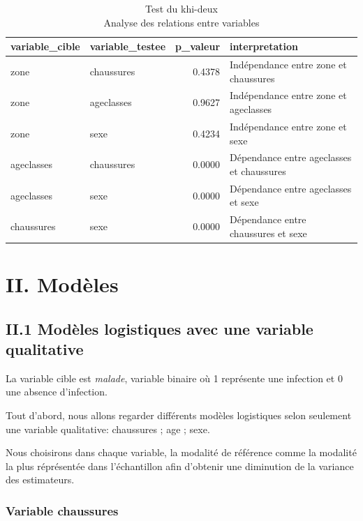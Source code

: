 \documentclass[
]{article}
\begin{document}
\begin{table}[!t]
\caption*{
{\large Test du khi-deux} \\ 
{\small Analyse des relations entre variables}
} 
\fontsize{12.0pt}{14.4pt}\selectfont
\begin{tabular*}{\linewidth}{@{\extracolsep{\fill}}llrl}
\toprule
variable\_cible & variable\_testee & p\_valeur & interpretation \\ 
\midrule\addlinespace[2.5pt]
zone & chaussures & 0.4378 & Indépendance entre zone et chaussures \\ 
zone & ageclasses & 0.9627 & Indépendance entre zone et ageclasses \\ 
zone & sexe & 0.4234 & Indépendance entre zone et sexe \\ 
ageclasses & chaussures & 0.0000 & Dépendance entre ageclasses et chaussures \\ 
ageclasses & sexe & 0.0000 & Dépendance entre ageclasses et sexe \\ 
chaussures & sexe & 0.0000 & Dépendance entre chaussures et sexe \\ 
\bottomrule
\end{tabular*}
\end{table}

\section{II. Modèles}\label{ii.-moduxe8les}

\subsection{II.1 Modèles logistiques avec une variable
qualitative}\label{ii.1-moduxe8les-logistiques-avec-une-variable-qualitative}

La variable cible est \emph{malade}, variable binaire où 1 représente
une infection et 0 une absence d'infection.

Tout d'abord, nous allons regarder différents modèles logistiques selon
seulement une variable qualitative: chaussures ; age ; sexe.

Nous choisirons dans chaque variable, la modalité de référence comme la
modalité la plus réprésentée dans l'échantillon afin d'obtenir une
diminution de la variance des estimateurs.

\subsubsection{Variable chaussures}\label{variable-chaussures}
\end{document}
